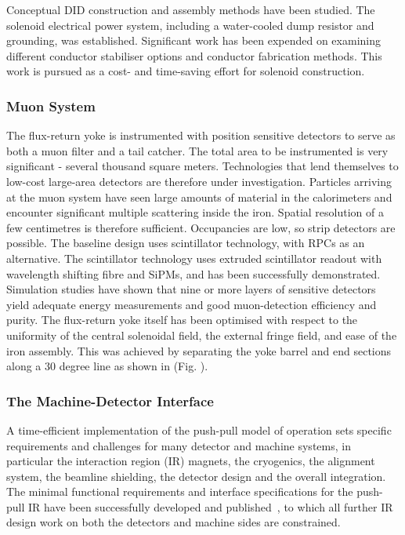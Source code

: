 Conceptual DID construction and
assembly methods have been studied. The solenoid electrical power system,
including a water-cooled dump resistor and grounding, was established.
Significant work has been expended on examining different conductor stabiliser
options and conductor fabrication methods. This work is pursued as a cost- and
time-saving effort for solenoid construction.

\subsubsection{Muon System}
The flux-return yoke is instrumented with position sensitive detectors to
serve as both a muon filter and a tail catcher. The total area to be
instrumented is very significant - several thousand square meters. Technologies
that lend themselves to low-cost large-area detectors are therefore under
investigation. Particles arriving at the muon system have seen large amounts of
material in the calorimeters and encounter significant multiple scattering
inside the iron. Spatial resolution of a few centimetres is therefore
sufficient. Occupancies are low, so strip detectors are possible. The \sid
baseline design uses scintillator technology, with RPCs as an alternative. 
The scintillator technology uses extruded scintillator readout with wavelength 
shifting fibre and SiPMs, and has been successfully demonstrated. 
Simulation studies have shown that nine or more layers of sensitive detectors 
yield adequate energy measurements and good muon-detection efficiency and purity.
The flux-return yoke itself has been optimised with respect to the uniformity of the central solenoidal field, the external fringe field, and ease of the iron assembly. This was achieved by separating the yoke barrel and end sections along a 30 degree line as shown in (Fig. ).

\subsubsection{The Machine-Detector Interface}
A time-efficient implementation of the push-pull model of
operation sets specific requirements and challenges for many detector and
machine systems, in particular the interaction region (IR) magnets, the
cryogenics, the alignment system, the beamline shielding, the detector design
and the overall integration. The minimal functional requirements and interface
specifications for the push-pull IR have been successfully developed and
published~\cite{Platform_Agreement,IR_Layout}, to which all further IR design
work on both the detectors and machine sides are constrained.

